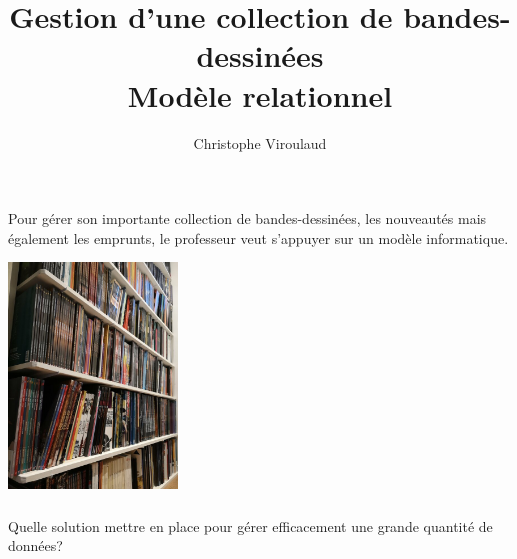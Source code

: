 \documentclass[svgnames,11pt]{beamer}
\author[]{Christophe Viroulaud}
\title{Gestion d'une collection de bandes-dessinées\\Modèle relationnel}
\date{\framebox{\textbf{BDD 01}}}
\institute{Terminale - NSI}
\begin{document}
\begin{frame}
\titlepage
\end{frame}
\begin{frame}
    \frametitle{}

    Pour gérer son importante collection de bandes-dessinées, les nouveautés mais également les emprunts, le professeur veut s'appuyer sur un modèle informatique.
    \begin{center}
    \centering
    \includegraphics[width=4.5cm]{ressources/biblio.jpg}
    \label{IMG}
    \end{center}

\end{frame}
\begin{frame}
    \frametitle{}

    \begin{framed}
        Quelle solution mettre en place pour gérer efficacement une grande quantité de données?
    \end{framed}

\end{frame}
\end{document}
